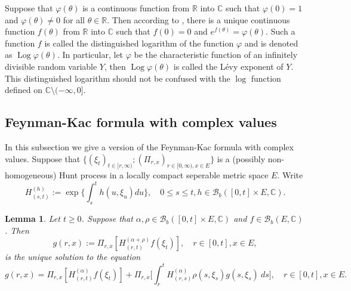 \documentclass[12pt,a4paper]{amsart}
\theoremstyle{plain}
\newtheorem{lem}[thm]{Lemma}
\theoremstyle{definition}
\numberwithin{equation}{section}
\begin{document}
	Suppose that $\varphi(\theta)$ is a continuous function from $\mathbb R$ into $\mathbb C$ such that $\varphi(0) = 1$ and $\varphi(\theta) \neq 0$ for all $\theta \in \mathbb R$.
	Then according to \cite[Lemma 7.6]{Sato1999Levy}, there is a unique continuous function $f(\theta)$ from $\mathbb R$ into $\mathbb C$ such that $f(0) = 0$ and $e^{f(\theta)} = \varphi(\theta)$.
	Such a function $f$ is called the distinguished logarithm of the function $\varphi$ and is denoted as $\operatorname{Log} \varphi(\theta)$.
	In particular, let $\varphi$ be the characteristic function of an infinitely divisible random variable $Y$, then $\operatorname{Log} \varphi(\theta)$ is called the L\'evy exponent of $Y$.
 	This distinguished logarithm should not be confused with the $\log$ function defined on $\mathbb C\setminus (-\infty, 0]$.

\subsection{Feynman-Kac formula with complex values}
\label{seq: complex Feynman-Kac transform}
    In this subsection we give a version of the Feynman-Kac formula with complex values.
    Suppose that $\{(\xi_t)_{t \in [r,\infty)}; (\Pi_{r,x})_{r\in [0,\infty), x\in E}\}$ is a (possibly non-homogeneous) Hunt process in a locally compact seperable metric space $E$.
    Write
\begin{equation}
    H^{(h)}_{(s,t)}
    := \exp\Big\{\int_s^t h(u,\xi_u) du\Big\},
    \quad 0 \leq s \leq t, h \in \mathcal B_b([0,t] \times E,\mathbb C).
\end{equation}

\begin{lem}
    Let $t \geq 0$. Suppose that $\alpha,\rho\in \mathcal B_b([0,t] \times E, \mathbb C)$ and $f\in \mathcal B_b(E, \mathbb C)$.
    Then
\begin{equation}
    g(r,x) := \Pi_{r,x}[ H_{(r,t)}^{(\alpha+\rho)} f(\xi_t)],\quad r \in [0,t], x\in E,
\end{equation}
    is the unique solution to the equation
\[
    g(r,x)= \Pi_{r,x} [ H_{(r,t)}^{(\alpha)} f(\xi_t)]+\Pi_{r,x} \Big[ \int_r^tH_{(r,s)}^{(\alpha)}\rho(s,\xi_s) g(s,\xi_s)~ds \Big],\quad r \in [0,t], x\in E.
\]
\end{lem}
\end{document}
